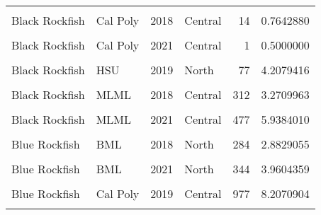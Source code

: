\documentclass[
]{article}
\begin{document}
\begin{longtable}[t]{llrlrr}
\cellcolor{gray!6}{Black Rockfish} & \cellcolor{gray!6}{BML} & \cellcolor{gray!6}{2021} & \cellcolor{gray!6}{North} & \cellcolor{gray!6}{171} & \cellcolor{gray!6}{2.4034809}\\
Black Rockfish & Cal Poly & 2018 & Central & 14 & 0.7642880\\
\cellcolor{gray!6}{Black Rockfish} & \cellcolor{gray!6}{Cal Poly} & \cellcolor{gray!6}{2019} & \cellcolor{gray!6}{Central} & \cellcolor{gray!6}{4} & \cellcolor{gray!6}{1.3318535}\\
\addlinespace
Black Rockfish & Cal Poly & 2021 & Central & 1 & 0.5000000\\
\cellcolor{gray!6}{Black Rockfish} & \cellcolor{gray!6}{HSU} & \cellcolor{gray!6}{2018} & \cellcolor{gray!6}{North} & \cellcolor{gray!6}{97} & \cellcolor{gray!6}{3.2784358}\\
Black Rockfish & HSU & 2019 & North & 77 & 4.2079416\\
\cellcolor{gray!6}{Black Rockfish} & \cellcolor{gray!6}{HSU} & \cellcolor{gray!6}{2021} & \cellcolor{gray!6}{North} & \cellcolor{gray!6}{202} & \cellcolor{gray!6}{6.4680716}\\
Black Rockfish & MLML & 2018 & Central & 312 & 3.2709963\\
\addlinespace
\cellcolor{gray!6}{Black Rockfish} & \cellcolor{gray!6}{MLML} & \cellcolor{gray!6}{2019} & \cellcolor{gray!6}{Central} & \cellcolor{gray!6}{389} & \cellcolor{gray!6}{4.2255708}\\
Black Rockfish & MLML & 2021 & Central & 477 & 5.9384010\\
\cellcolor{gray!6}{Black Rockfish} & \cellcolor{gray!6}{UCSB} & \cellcolor{gray!6}{2021} & \cellcolor{gray!6}{South} & \cellcolor{gray!6}{2} & \cellcolor{gray!6}{0.7692308}\\
Blue Rockfish & BML & 2018 & North & 284 & 2.8829055\\
\cellcolor{gray!6}{Blue Rockfish} & \cellcolor{gray!6}{BML} & \cellcolor{gray!6}{2019} & \cellcolor{gray!6}{North} & \cellcolor{gray!6}{476} & \cellcolor{gray!6}{4.1525805}\\
\addlinespace
Blue Rockfish & BML & 2021 & North & 344 & 3.9604359\\
\cellcolor{gray!6}{Blue Rockfish} & \cellcolor{gray!6}{Cal Poly} & \cellcolor{gray!6}{2018} & \cellcolor{gray!6}{Central} & \cellcolor{gray!6}{1851} & \cellcolor{gray!6}{11.0306106}\\
Blue Rockfish & Cal Poly & 2019 & Central & 977 & 8.2070904\\
\cellcolor{gray!6}{Blue Rockfish} & \cellcolor{gray!6}{Cal Poly} & \cellcolor{gray!6}{2021} & \cellcolor{gray!6}{Central} & \cellcolor{gray!6}{396} & \cellcolor{gray!6}{6.3859919}\\

\end{longtable}
\end{document}
